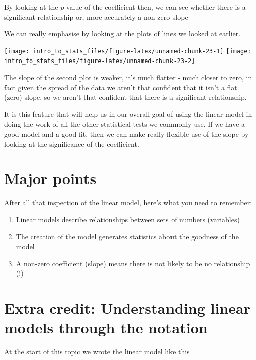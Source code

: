 \documentclass[
]{book}
\providecommand{\tightlist}{%
  \setlength{\itemsep}{0pt}\setlength{\parskip}{0pt}}
\begin{document}
By looking at the \(p\)-value of the coefficient then, we can see whether there is a significant relationship or, more accurately a non-zero slope

We can really emphasise by looking at the plots of lines we looked at earlier.

\texttt{[image: intro\_to\_stats\_files/figure-latex/unnamed-chunk-23-1]} \texttt{[image: intro\_to\_stats\_files/figure-latex/unnamed-chunk-23-2]}

The slope of the second plot is weaker, it's much flatter - much closer to zero, in fact given the spread of the data we aren't that confident that it isn't a flat (zero) slope, so we aren't that confident that there is a significant relationship.

It is this feature that will help us in our overall goal of using the linear model in doing the work of all the other statistical tests we commonly use. If we have a good model and a good fit, then we can make really flexible use of the slope by looking at the significance of the coefficient.

\hypertarget{major-points}{%
\section{Major points}\label{major-points}}

After all that inspection of the linear model, here's what you need to remember:

\begin{enumerate}
\def\labelenumi{\arabic{enumi}.}
\tightlist
\item
  Linear models describe relationships between sets of numbers (variables)
\item
  The creation of the model generates statistics about the goodness of the model
\item
  A non-zero coefficient (slope) means there is not likely to be no relationship (!)
\end{enumerate}

\hypertarget{extra-credit-understanding-linear-models-through-the-notation}{%
\section{Extra credit: Understanding linear models through the notation}\label{extra-credit-understanding-linear-models-through-the-notation}}

At the start of this topic we wrote the linear model like this
\end{document}
